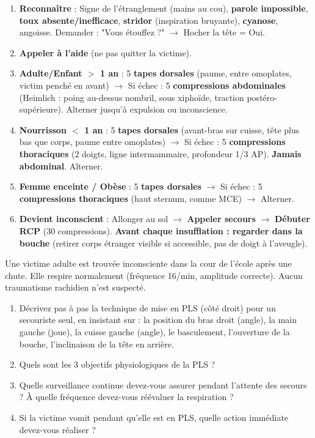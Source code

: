 \documentclass[11pt]{article}
\newcommand{\cle}[1]{{\popxbold\color{popdark}#1}}
\begin{document}
\begin{methode}
\begin{enumerate}
    \item \textbf{Reconnaître} : Signe de l'étranglement (mains au cou), \textbf{parole impossible}, \textbf{toux absente/inefficace}, \textbf{stridor} (inspiration bruyante), \textbf{cyanose}, angoisse. \cle{Demander : "Vous étouffez ?" $\rightarrow$ Hocher la tête = Oui}.
    \item \textbf{Appeler à l'aide} (ne pas quitter la victime).
    \item \textbf{Adulte/Enfant $>$ 1 an} : 5 \textbf{tapes dorsales} (paume, entre omoplates, victim penché en avant) $\rightarrow$ Si échec : 5 \textbf{compressions abdominales} (Heimlich : poing au-dessus nombril, sous xiphoïde, traction postéro-supérieure). Alterner jusqu'à expulsion ou inconscience.
    \item \textbf{Nourrisson $<$ 1 an} : 5 \textbf{tapes dorsales} (avant-bras sur cuisse, tête plus bas que corps, paume entre omoplates) $\rightarrow$ Si échec : 5 \textbf{compressions thoraciques} (2 doigts, ligne intermammaire, profondeur 1/3 AP). \textbf{Jamais abdominal}. Alterner.
    \item \textbf{Femme enceinte / Obèse} : 5 \textbf{tapes dorsales} $\rightarrow$ Si échec : 5 \textbf{compressions thoraciques} (haut sternum, comme MCE) $\rightarrow$ Alterner.
    \item \textbf{Devient inconscient} : Allonger au sol $\rightarrow$ \textbf{Appeler secours} $\rightarrow$ \textbf{Débuter RCP} (30 compressions). \textbf{Avant chaque insufflation : regarder dans la bouche} (retirer corps étranger visible si accessible, pas de doigt à l'aveugle).
\end{enumerate}
\end{methode}

\begin{exercice}
Une victime adulte est trouvée inconsciente dans la cour de l'école après une chute. Elle respire normalement (fréquence 16/min, amplitude correcte). Aucun traumatisme rachidien n'est suspecté.
\begin{enumerate}
    \item Décrivez pas à pas la technique de mise en PLS (côté droit) pour un secouriste seul, en insistant sur : la position du bras droit (angle), la main gauche (joue), la cuisse gauche (angle), le basculement, l'ouverture de la bouche, l'inclinaison de la tête en arrière.
    \item Quels sont les 3 objectifs physiologiques de la PLS ?
    \item Quelle surveillance continue devez-vous assurer pendant l'attente des secours ? À quelle fréquence devez-vous réévaluer la respiration ?
    \item Si la victime vomit pendant qu'elle est en PLS, quelle action immédiate devez-vous réaliser ?
\end{enumerate}
\end{exercice}
\end{document}
